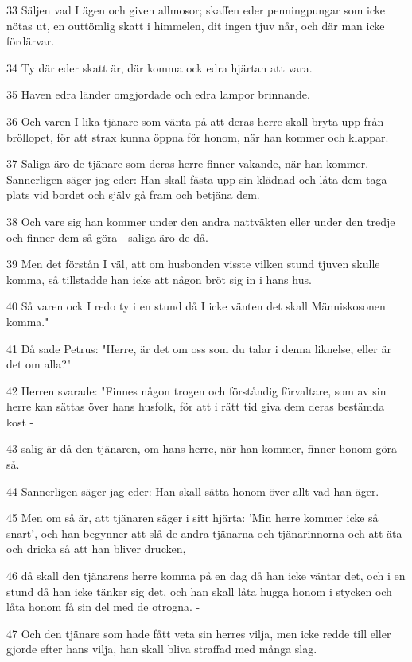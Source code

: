 \par 33 Säljen vad I ägen och given allmosor; skaffen eder penningpungar som icke nötas ut, en outtömlig skatt i himmelen, dit ingen tjuv når, och där man icke fördärvar.
\par 34 Ty där eder skatt är, där komma ock edra hjärtan att vara.
\par 35 Haven edra länder omgjordade och edra lampor brinnande.
\par 36 Och varen I lika tjänare som vänta på att deras herre skall bryta upp från bröllopet, för att strax kunna öppna för honom, när han kommer och klappar.
\par 37 Saliga äro de tjänare som deras herre finner vakande, när han kommer. Sannerligen säger jag eder: Han skall fästa upp sin klädnad och låta dem taga plats vid bordet och själv gå fram och betjäna dem.
\par 38 Och vare sig han kommer under den andra nattväkten eller under den tredje och finner dem så göra - saliga äro de då.
\par 39 Men det förstån I väl, att om husbonden visste vilken stund tjuven skulle komma, så tillstadde han icke att någon bröt sig in i hans hus.
\par 40 Så varen ock I redo ty i en stund då I icke vänten det skall Människosonen komma."
\par 41 Då sade Petrus: "Herre, är det om oss som du talar i denna liknelse, eller är det om alla?"
\par 42 Herren svarade: "Finnes någon trogen och förståndig förvaltare, som av sin herre kan sättas över hans husfolk, för att i rätt tid giva dem deras bestämda kost -
\par 43 salig är då den tjänaren, om hans herre, när han kommer, finner honom göra så.
\par 44 Sannerligen säger jag eder: Han skall sätta honom över allt vad han äger.
\par 45 Men om så är, att tjänaren säger i sitt hjärta: 'Min herre kommer icke så snart', och han begynner att slå de andra tjänarna och tjänarinnorna och att äta och dricka så att han bliver drucken,
\par 46 då skall den tjänarens herre komma på en dag då han icke väntar det, och i en stund då han icke tänker sig det, och han skall låta hugga honom i stycken och låta honom få sin del med de otrogna. -
\par 47 Och den tjänare som hade fått veta sin herres vilja, men icke redde till eller gjorde efter hans vilja, han skall bliva straffad med många slag.
